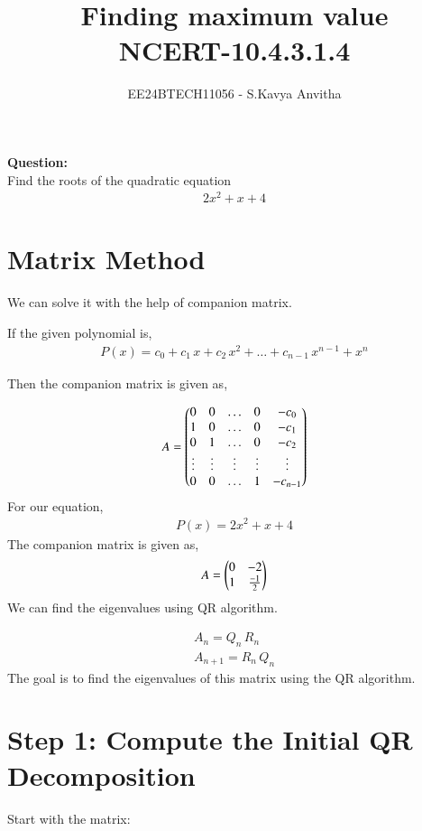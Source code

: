 \documentclass[journal]{IEEEtran}
\begin{document}

\vspace{3cm}

\title{Finding maximum value\\NCERT-10.4.3.1.4}
\author{EE24BTECH11056 - S.Kavya Anvitha}
\maketitle
\bigskip

\renewcommand{\thefigure}{\theenumi}
\renewcommand{\thetable}{\theenumi}
\textbf{Question:}\\
Find the roots of the quadratic equation 
\begin{align*}
    2x^2 + x + 4
\end{align*}
\section{\textbf{Matrix Method}}
We can solve it with the help of companion matrix.

If the given polynomial is,
\begin{align}
	P(x) = c_0 + c_1\,x + c_2\,x^2 + \dots + c_{n-1}\,x^{n-1} + x^n
\end{align}

Then the companion matrix is given as,

\begin{align}
	A = \begin{pmatrix}0 & 0 & \dots & 0 & -c_0\\1 & 0 & \dots & 0 & -c_1\\0 & 1 & \dots & 0 & -c_2\\\vdots & \vdots & \vdots & \vdots &\vdots \\0 & 0 & \dots & 1 & -c_{n-1}\end{pmatrix}
\end{align}
For our equation,
\begin{align}
  P(x) =  2x^2 + x + 4
\end{align}
The companion matrix is given as,
\begin{align}
   A = \begin{pmatrix}0 & -2\\1 & \frac{-1}{2}\end{pmatrix} 
\end{align}
We can find the eigenvalues using QR algorithm.

\begin{align}
   A_n = Q_n\,R_n\\
   A_{n+1} = R_n\,Q_n
\end{align}
The goal is to find the eigenvalues of this matrix using the QR algorithm.

\section*{Step 1: Compute the Initial QR Decomposition}
Start with the matrix:
\end{document}

